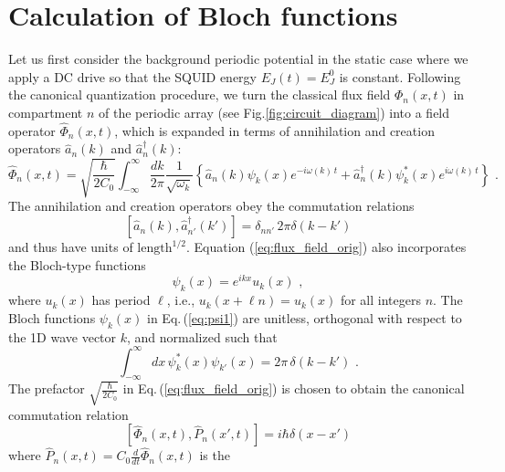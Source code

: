 \chapter{Calculation of Bloch functions}\label{ch:appendix_bloch}
%
\noindent
Let us first consider the background periodic potential in the static case where we apply a DC drive so that the SQUID energy $E_J(t) = E_J^0$ is constant. Following the canonical quantization procedure, we turn the classical flux field ${\Phi}_n(x,t)$ 
in compartment $n$ of the periodic array (see Fig.\ref{fig:circuit_diagram})
into a field operator $\hat{\Phi}_n(x,t)$, which is expanded in terms of 
annihilation and creation operators $ \hat{a}_n(k)$ and ${\hat a}_n^\dagger(k)$:
%
\begin{equation} \label{eq:flux_field_orig}
    \hat{\Phi}_n(x,t) = \sqrt{\frac{\hbar}{2 C_0}} 
    \int_{-\infty}^{\infty}\frac{dk}{2 \pi} \frac{1}{\sqrt{\omega_k}}
    \left\{ \hat{a}_n(k) \psi_k(x)e^{-i \omega(k) \, t} + 
    \hat{a}_n^{\dagger}(k) \psi_k^*(x) e^{i \omega(k) \, t} \right\} \, \, .
\end{equation}
%
The annihilation and creation operators obey the commutation relations
%
\begin{equation} \label{eq:cra_orig}
    \left[ \hat{a}_n(k),{\hat a}_{n'}^\dagger(k') \right] = \delta_{nn'} \, 2 \pi \delta(k - k')
\end{equation}
%
and thus have units of $\text{length}^{1/2}$.
Equation (\ref{eq:flux_field_orig}) also incorporates the Bloch-type functions 
%
\begin{equation} \label{eq:psi1}
\psi_k(x) = e^{i k x} u_k(x) \, \, ,   
\end{equation}
%
where $u_k(x)$ has period $\ell$, i.e., $u_k(x + \ell n) = u_k(x)$ for all integers $n$.
The Bloch functions $\psi_k(x)$ in Eq.\,(\ref{eq:psi1}) are unitless, orthogonal with respect to 
the 1D wave vector $k$, and normalized such that
%
\begin{equation} \label{eq:psi1_norm_orig}
\int_{-\infty}^{\infty} dx \, \psi^*_k(x) \psi_{k'}(x) = 2 \pi \, \delta(k - k') \, \, .
\end{equation}
%
The prefactor $\displaystyle{\sqrt{\frac{\hbar}{2 C_0}}}$ in Eq.\,(\ref{eq:flux_field_orig}) is chosen 
to obtain the canonical commutation relation 
%
\begin{equation} \label{eq:commrelphi}
\left[ \hat{\Phi}_n(x,t), \hat{P}_n(x',t) \right] = i \hbar \delta(x-x')
\end{equation}
%
where $\hat{P}_n(x,t) = C_0 \displaystyle{\frac{d}{dt}} \hat{\Phi}_n(x,t)$ is the 
